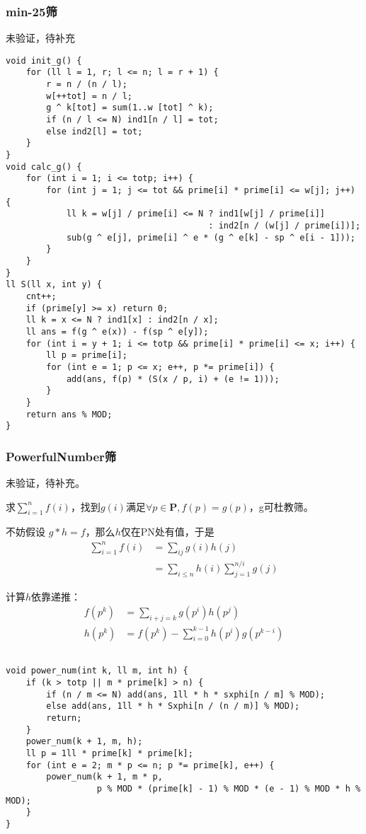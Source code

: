 \documentclass[twoside]{article}
\begin{document}
\subsubsection{min-25筛}
未验证，待补充
\begin{lstlisting}
void init_g() {
	for (ll l = 1, r; l <= n; l = r + 1) {
		r = n / (n / l);
		w[++tot] = n / l;
		g ^ k[tot] = sum(1..w [tot] ^ k);
		if (n / l <= N) ind1[n / l] = tot;
		else ind2[l] = tot;
	}
}
void calc_g() {
	for (int i = 1; i <= totp; i++) {
		for (int j = 1; j <= tot && prime[i] * prime[i] <= w[j]; j++) {
			ll k = w[j] / prime[i] <= N ? ind1[w[j] / prime[i]]
			                            : ind2[n / (w[j] / prime[i])];
			sub(g ^ e[j], prime[i] ^ e * (g ^ e[k] - sp ^ e[i - 1]));
		}
	}
}
ll S(ll x, int y) {
	cnt++;
	if (prime[y] >= x) return 0;
	ll k = x <= N ? ind1[x] : ind2[n / x];
	ll ans = f(g ^ e(x)) - f(sp ^ e[y]);
	for (int i = y + 1; i <= totp && prime[i] * prime[i] <= x; i++) {
		ll p = prime[i];
		for (int e = 1; p <= x; e++, p *= prime[i]) {
			add(ans, f(p) * (S(x / p, i) + (e != 1)));
		}
	}
	return ans % MOD;
}\end{lstlisting}
\subsubsection{PowerfulNumber筛}
未验证，待补充。
\par 求$\sum_{i=1}^n f(i)$，找到$g(i)$满足$\forall p\in
\mathbf{P},f(p)=g(p)$，g可杜教筛。 \par 不妨假设 $g\ast h =
f$，那么$h$仅在PN处有值，于是
$$\begin{aligned} \sum_{i=1}^{n} f(i)&=\sum_{ij} g(i)h(j) \\ &= \sum_{i\le n}
h(i) \sum_{j=1}^{n/i} g(j)\end{aligned}$$ \par 计算$h$依靠递推：
$$\begin{aligned}
f(p^k)&=\sum_{i+j=k}g(p^i)h(p^j)\\ h(p^k)&=f(p^k)-\sum_{i=0}^{k-1}h(p^i)g(p^{k-i})\end{aligned}$$
\begin{lstlisting}

void power_num(int k, ll m, int h) {
	if (k > totp || m * prime[k] > n) {
		if (n / m <= N) add(ans, 1ll * h * sxphi[n / m] % MOD);
		else add(ans, 1ll * h * Sxphi[n / (n / m)] % MOD);
		return;
	}
	power_num(k + 1, m, h);
	ll p = 1ll * prime[k] * prime[k];
	for (int e = 2; m * p <= n; p *= prime[k], e++) {
		power_num(k + 1, m * p,
		          p % MOD * (prime[k] - 1) % MOD * (e - 1) % MOD * h % MOD);
	}
}\end{lstlisting}
\end{document}
